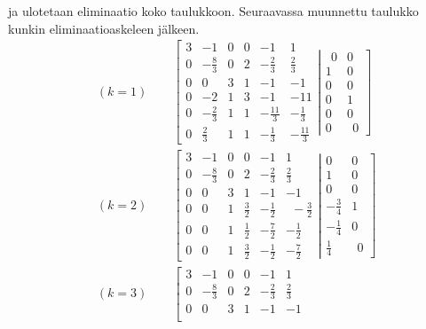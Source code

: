 ja ulotetaan eliminaatio koko taulukkoon. Seuraavassa muunnettu taulukko kunkin 
eliminaatioaskeleen jälkeen.
\begin{align*}
&(k=1) \qquad \left[\begin{array}{rrrrrr}
                    3&-1&0&0&-1&1\\0&-\frac{8}{3}&0&2&-\frac{2}{3}&\frac{2}{3}\\
                    0&0&3&1&-1&-1\\0&-2&1&3&-1&-11 \\
                    0&-\frac{2}{3}&1&1&-\frac{11}{3}&-\frac{1}{3} \\[0.5mm]
                    0&\frac{2}{3}&1&1&-\frac{1}{3}&-\frac{11}{3} 
                    \end{array} \right.
       \left. \left|\begin{array}{rr} 
                    \ \ 0&0\\1&0\\0&0\\0&1\\0&0\\0&\ \ 0 
                    \end{array} \right. \right] \\[5mm]
&(k=2) \qquad \left[\begin{array}{rrrrrr} 
                    3&-1&0&0&-1&1\\0&-\frac{8}{3}&0&2&-\frac{2}{3}&\frac{2}{3}\\0&0&3&1&-1&-1\\
                    0&0&1&\frac{3}{2}&-\frac{1}{2}&\ \ -\frac{3}{2}\\[0.5mm]
                    0&0&1&\frac{1}{2}&-\frac{7}{2}&-\frac{1}{2}\\[0.5mm]
                    0&0&1&\frac{3}{2}&-\frac{1}{2}&-\frac{7}{2} 
                    \end{array} \right.
       \left. \left|\begin{array}{rr}
                    0&0\\1&0\\0&0\\-\frac{3}{4}&1\\-\frac{1}{4}&0\\ \frac{1}{4} & \ \ 0
                    \end{array} \right. \right] \\[5mm]
&(k=3) \qquad \left[\begin{array}{rrrrrr} 
                    3&-1&0&0&-1&1\\0&-\frac{8}{3}&0&2&-\frac{2}{3}&\frac{2}{3}\\0&0&3&1&-1&-1\\

\end{array}
\end{align*}
